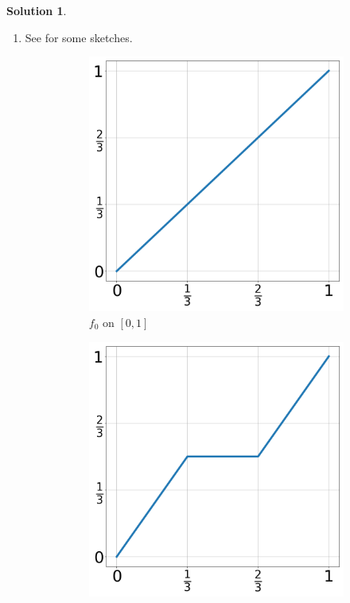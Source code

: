 \documentclass[12pt]{article}
\theoremstyle{definition}
\theoremstyle{exercise}
\theoremstyle{solution}
\newtheorem*{solution}{Solution}
\begin{document}
\begin{solution}
    \begin{enumerate}
        \item See  for some sketches.
        \begin{figure}[H]
            \centering
            \begin{subfigure}{0.47\textwidth}
                \centering
                \includegraphics[width=\linewidth]{UA_Section_6_2_Figure_1.png}
                \caption{\( f_0 \) on \( [0, 1] \)}
                \label{fig:1sub1}
            \end{subfigure}%
            \begin{subfigure}{0.47\textwidth}
                \centering
                \includegraphics[width=\linewidth]{UA_Section_6_2_Figure_2.png}

\end{subfigure}
\end{figure}
\end{enumerate}
\end{solution}
\end{document}
